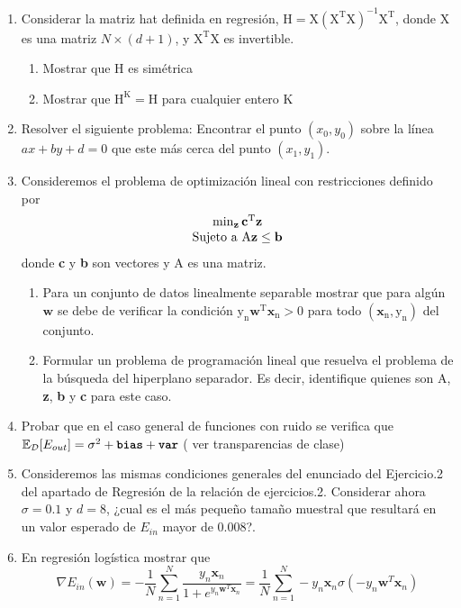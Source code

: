 \documentclass[	DIV=calc,%
							paper=a4,%
							fontsize=11pt]{scrartcl}	 					%
\begin{document}
\begin{enumerate}
    \item Considerar la matriz hat definida en regresión,  $\mathrm{H}=\mathrm{X(X^TX)^{-1}X^T}$, donde $\mathrm{X}$ es una matriz  $N\times (d+1)$, y $\mathrm{X^TX}$ es invertible.
    \begin{enumerate}
        \item Mostrar que $\mathrm{H}$ es simétrica
        \item Mostrar que $\mathrm{H^K=H}$ para cualquier entero K
    \end{enumerate}

    \item
    Resolver el siguiente problema: Encontrar el punto $(x_0,y_0)$ sobre la línea $ax+by+d=0$ que este más cerca del punto $(x_1,y_1)$.
    \item Consideremos el problema de optimización lineal con restricciones definido por
    \[
    \begin{array}{c}
    \min_{\textbf{z}} \mathrm{\mathbf{c}^T\textbf{z}} \\
    \hbox{Sujeto a } \mathrm{A\textbf{z} \leq \mathbf{b}}
    \end{array}
    \]
    donde \textbf{c} y \textbf{b} son vectores y A es una matriz.

         \begin{enumerate}
            \item Para un conjunto de datos linealmente separable mostrar que para algún $\textbf{w}$ se debe de verificar la condición  $\mathrm{y_n\textbf{w}^T\textbf{x}_n>0 }$ para todo $\mathrm{(\textbf{x}_n,y_n)}$ del conjunto.
            \item Formular un problema de programación lineal que resuelva el problema de la búsqueda del hiperplano separador. Es decir, identifique quienes son  A, \textbf{z}, \textbf{b} y \textbf{c} para este caso.
        \end{enumerate}


    \item Probar que en el caso general de funciones con ruido se verifica que $\mathbb{E}_{\mathcal{D}}[E_{out}]= \sigma^2+\texttt{\textbf{bias}}+\texttt{\textbf{var}}$ ( ver transparencias de clase)

    \item  Consideremos las mismas condiciones generales del enunciado del Ejercicio.2 del apartado de Regresión de la relación de ejercicios.2.
    Considerar ahora $\sigma=0.1$ y $d=8$, ¿cual es el más pequeño tamaño muestral que resultará en un valor esperado de $E_{in}$ mayor de $0.008$?.
    \item En regresión logística mostrar que
\[
\nabla E_{in}(\textbf{w})=-\frac{1}{N}\sum_{n=1}^{N}\frac{y_n\textbf{x}_n}{1+e^{y_n \textbf{w}^T\textbf{x}_n}}= \frac{1}{N}\sum_{n=1}^{N}-y_n\textbf{x}_n\sigma(-y_n\textbf{w}^T\textbf{x}_n)
\]


\end{enumerate}
\end{document}
